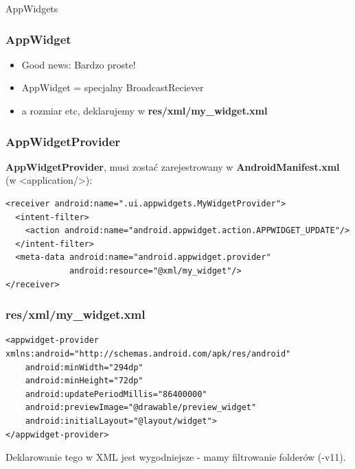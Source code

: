 % 
% 
% 
% 
% 
% 
% 


\begin{frame}
 \begin{center}
  \Huge{AppWidgets}
 \end{center}
\end{frame}

\begin{frame}\frametitle{AppWidget}
\begin{itemize}
 \item Good news: Bardzo proste!
 \item AppWidget = specjalny BroadcastReciever
 \item a rozmiar etc, deklarujemy w \textbf{res/xml/my\_widget.xml}
\end{itemize}
\end{frame}


\begin{frame}[fragile]\frametitle{AppWidgetProvider}
\textbf{AppWidgetProvider}, musi zostać zarejestrowany w \textbf{AndroidManifest.xml} (w <application/>):
\begin{lstlisting}
<receiver android:name=".ui.appwidgets.MyWidgetProvider">
  <intent-filter>
    <action android:name="android.appwidget.action.APPWIDGET_UPDATE"/>
  </intent-filter>
  <meta-data android:name="android.appwidget.provider"
             android:resource="@xml/my_widget"/>
</receiver>
\end{lstlisting}
\end{frame}

\begin{frame}[fragile]\frametitle{res/xml/\textbf{my\_widget.xml}}
\begin{lstlisting}
<appwidget-provider xmlns:android="http://schemas.android.com/apk/res/android"
    android:minWidth="294dp"
    android:minHeight="72dp"
    android:updatePeriodMillis="86400000"
    android:previewImage="@drawable/preview_widget"
    android:initialLayout="@layout/widget">
</appwidget-provider>
\end{lstlisting}
Deklarowanie tego w XML jest wygodniejsze - mamy filtrowanie folderów (-v11).
\end{frame}



